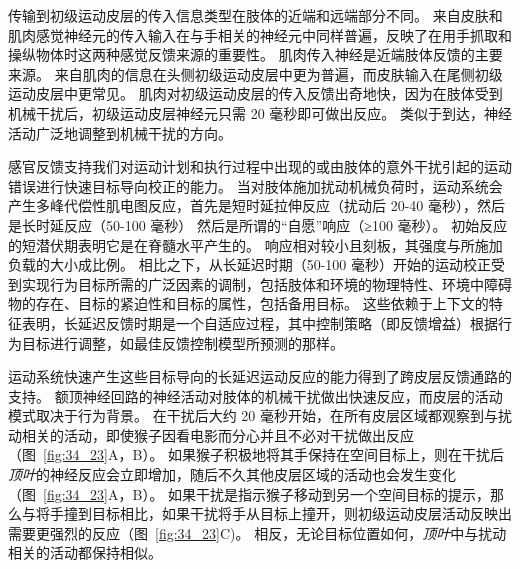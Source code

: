 传输到初级运动皮层的传入信息类型在肢体的近端和远端部分不同。
来自皮肤和肌肉感觉神经元的传入输入在与手相关的神经元中同样普遍，反映了在用手抓取和操纵物体时这两种感觉反馈来源的重要性。
肌肉传入神经是近端肢体反馈的主要来源。
来自肌肉的信息在头侧初级运动皮层中更为普遍，而皮肤输入在尾侧初级运动皮层中更常见。
肌肉对初级运动皮层的传入反馈出奇地快，因为在肢体受到机械干扰后，初级运动皮层神经元只需 20 毫秒即可做出反应。
类似于到达，神经活动广泛地调整到机械干扰的方向。


感官反馈支持我们对运动计划和执行过程中出现的或由肢体的意外干扰引起的运动错误进行快速目标导向校正的能力。
当对肢体施加扰动机械负荷时，运动系统会产生多峰代偿性肌电图反应，首先是短时延拉伸反应（扰动后 20-40 毫秒），然后是长时延反应（50-100 毫秒） 然后是所谓的“自愿”响应（≥100 毫秒）。
初始反应的短潜伏期表明它是在脊髓水平产生的。
响应相对较小且刻板，其强度与所施加负载的大小成比例。
相比之下，从长延迟时期（50-100 毫秒）开始的运动校正受到实现行为目标所需的广泛因素的调制，包括肢体和环境的物理特性、环境中障碍物的存在、目标的紧迫性和目标的属性，包括备用目标。
这些依赖于上下文的特征表明，长延迟反馈时期是一个自适应过程，其中控制策略（即反馈增益）根据行为目标进行调整，如最佳反馈控制模型所预测的那样。


运动系统快速产生这些目标导向的长延迟运动反应的能力得到了跨皮层反馈通路的支持。
额顶神经回路的神经活动对肢体的机械干扰做出快速反应，而皮层的活动模式取决于行为背景。
在干扰后大约 20 毫秒开始，在所有皮层区域都观察到与扰动相关的活动，即使猴子因看电影而分心并且不必对干扰做出反应（图~\ref{fig:34_23}A，B）。
如果猴子积极地将其手保持在空间目标上，则在干扰后\textit{顶叶}的神经反应会立即增加，随后不久其他皮层区域的活动也会发生变化（图~\ref{fig:34_23}A，B）。
如果干扰是指示猴子移动到另一个空间目标的提示，那么与将手撞到目标相比，如果干扰将手从目标上撞开，则初级运动皮层活动反映出需要更强烈的反应（图~\ref{fig:34_23}C)。
相反，无论目标位置如何，\textit{顶叶}中与扰动相关的活动都保持相似。


